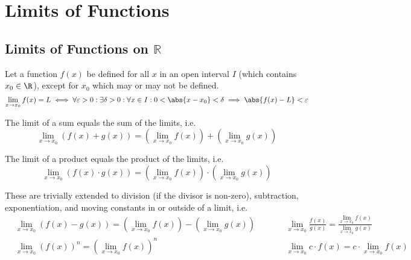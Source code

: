 \documentclass{article}
\begin{document}
\section{Limits of Functions}
\subsection{Limits of Functions on \texorpdfstring{\(\mathbb{R}\)}{the Reals}}
\begin{definition}
    Let a function \(f(x)\) be defined for all \(x\) in an open interval \(I\)
    (which contains \(x_0 \in \R\)), except for \(x_0\) which may or may not be defined.
    \begin{equation*}
        \lim_{x\to x_0} f(x) = L \iff \forall\varepsilon>0: \exists\delta>0: \forall x \in I: 0<\abs{x-x_0}<\delta \implies \abs{f(x)-L}<\varepsilon
    \end{equation*}
\end{definition}
%
\begin{tcolorboxlarge}[title={Limit Laws for Functions}]
    \begin{theorem} The limit of a sum equals the sum of the limits, i.e.
        \begin{equation*}
            \lim_{x\to x_0}\left(f(x)+g(x)\right)
            = \left(\lim_{x\to x_0}f(x)\right) + \left(\lim_{x\to x_0}g(x)\right)
        \end{equation*}
    \end{theorem}
    \begin{theorem} The limit of a product equals the product of the limits, i.e.
        \begin{equation*}
            \lim_{x\to x_0}\left(f(x)\cdot g(x)\right)
            = \left(\lim_{x\to x_0}f(x)\right) \cdot \left(\lim_{x\to x_0}g(x)\right)
        \end{equation*}
    \end{theorem}
    These are trivially extended to
    division (if the divisor is non-zero),
    subtraction, exponentiation, and moving constants in or outside of a limit, i.e.
    \begin{align*}
         & \lim_{x\to x_0}\left(f(x) - g(x)\right)
        = \left(\lim_{x\to x_0}f(x)\right) - \left(\lim_{x\to x_0}g(x)\right)
         & \qquad
         & \lim_{x\to x_0}\frac{f(x)}{g(x)}
        = \frac{\lim_{x\to x_0}f(x)}{\lim_{x\to x_0}g(x)}
        \\
         & \lim_{x\to x_0}\left(f(x)\right)^n
        = \left(\lim_{x\to x_0}f(x)\right)^n
         & \qquad
         & \lim_{x\to x_0} c \cdot f(x)
        = c \cdot \lim_{x\to x_0}f(x)
    \end{align*}
\end{tcolorboxlarge}
\end{document}
